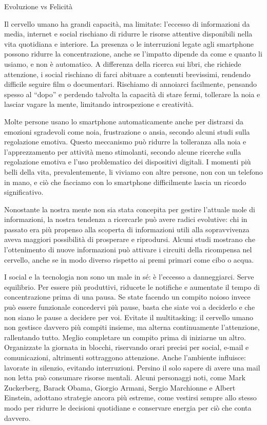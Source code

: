 \documentclass[12pt]{book} %
\begin{document}
\begin{mdframed}[linewidth=1pt]
Evoluzione vs Felicità

Il cervello umano ha grandi capacità, ma limitate: l’eccesso di informazioni da media, internet e social rischiano di ridurre le risorse attentive disponibili nella vita quotidiana e interiore. La presenza o le interruzioni legate agli smartphone possono ridurre la concentrazione, anche se l’impatto dipende da come e quanto li usiamo, e non è automatico. A differenza della ricerca sui libri, che richiede attenzione, i social rischiano di farci abituare a contenuti brevissimi, rendendo difficile seguire film o documentari. Rischiamo di annoiarci facilmente, pensando spesso al “dopo” e perdendo talvolta la capacità di stare fermi, tollerare la noia e lasciar vagare la mente, limitando introspezione e creatività.

Molte persone usano lo smartphone automaticamente anche per distrarsi da emozioni sgradevoli come noia, frustrazione o ansia, secondo alcuni studi sulla regolazione emotiva. Questo meccanismo può ridurre la tolleranza alla noia e l'apprezzamento per attività meno stimolanti, secondo alcune ricerche sulla regolazione emotiva e l’uso problematico dei dispositivi digitali. I momenti più belli della vita, prevalentemente, li viviamo con altre persone, non con un telefono in mano, e ciò che facciamo con lo smartphone difficilmente lascia un ricordo significativo.

Nonostante la nostra mente non sia stata concepita per gestire l'attuale mole di informazioni, la nostra tendenza a ricercarle può avere radici evolutive: chi in passato era più propenso alla scoperta di informazioni utili alla sopravvivenza aveva maggiori possibilità di prosperare e riprodursi. Alcuni studi mostrano che l’ottenimento di nuove informazioni può attivare i circuiti della ricompensa nel cervello, anche se in modo diverso rispetto ai premi primari come cibo o acqua.

I social e la tecnologia non sono un male in sé: è l’eccesso a danneggiarci. Serve equilibrio. Per essere più produttivi, riducete le notifiche e aumentate il tempo di concentrazione prima di una pausa. Se state facendo un compito noioso invece può essere funzionale
concedervi più pause, basta che siate voi a deciderlo e che non siano le pause a decidere per voi. Evitate il multitasking: il cervello umano non gestisce davvero più compiti insieme, ma alterna continuamente l’attenzione, rallentando tutto. Meglio completare un compito prima di iniziarne un altro. Organizzate la giornata in blocchi, riservando orari precisi per social, e-mail e comunicazioni, altrimenti sottraggono attenzione. Anche l’ambiente influisce: lavorate in silenzio, evitando interruzioni. Persino il solo sapere di avere una mail non letta può consumare risorse mentali. Alcuni personaggi noti, come Mark Zuckerberg, Barack Obama, Giorgio Armani, Sergio Marchionne e Albert Einstein, adottano strategie ancora più estreme, come vestirsi sempre allo stesso modo per ridurre le decisioni quotidiane e conservare energia per ciò che conta davvero.


\end{mdframed}
\end{document}
